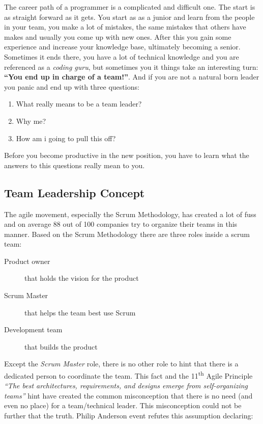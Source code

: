 
The career path of a programmer is a complicated and difficult one. The start is as straight forward as it gets. You start as as a junior and learn from the people in your team, you make a lot of mistakes, the same mistakes that others have makes and usually you come up with new ones. After this you gain some experience and increase your knowledge base, ultimately becoming a senior. Sometimes it ends there, you have a lot of technical knowledge and you are referenced as a \textit{coding guru}, but sometimes you it things take an interesting turn: \textbf{``You end up in charge of a team!''}. And if you are not a natural born leader you panic and end up with three questions:

\begin{enumerate}
	\item What really means to be a team leader?
	\item Why me?
	\item How am i going to pull this off?
\end{enumerate}

Before you become productive in the new position, you have to learn what the answers to this questions really mean to you.

\subsection{Team Leadership Concept}
\label{sub-sec:teamleadershipconcept}

The agile movement, especially the Scrum Methodology, has created a lot of fuss and on average 88 out of 100 companies try to organize their teams in this manner\cite{agile-survey}. Based on the Scrum Methodology there are three roles \cite{scrum} inside a scrum team:

\begin{description}
	\item[Product owner] that holds the vision for the product
	\item[Scrum Master] that helps the team best use Scrum
	\item[Development team] that builds the product
\end{description}

Except the \textit{{Scrum Master}} role, there is no other role to hint that there is a dedicated person to coordinate the team. This fact and the 11\textsuperscript{th} Agile Principle \textit{``The best architectures, requirements, and designs emerge from self-organizing teams''}\cite{agile-manifesto} hint have created the common misconception that there is no need (and even no place) for a team/technical leader. This misconception could not be further that the truth. Philip Anderson event refutes this assumption declaring:

